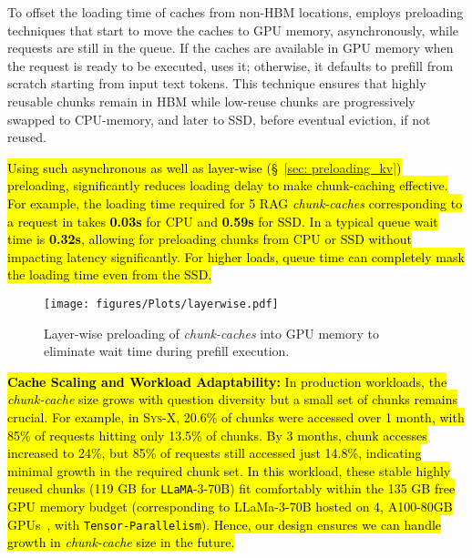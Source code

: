 To offset the loading time of caches from non-HBM locations, \sys employs preloading techniques that start to move the caches to GPU memory, asynchronously, while requests are still in the queue.
If the caches are available in GPU memory when the request is ready to be executed, \sys uses it; otherwise, it defaults to prefill from scratch starting from input text tokens. 
This technique ensures that highly reusable chunks remain in HBM while low-reuse chunks are progressively swapped to CPU-memory, and later to SSD, before eventual eviction, if not reused. 

\hl{Using such asynchronous as well as layer-wise (\S~\ref{sec: preloading_kv}) preloading, \sys significantly reduces loading delay to make chunk-caching effective.
%
For example, the loading time required for 5 RAG \textit{chunk-caches} corresponding to a request in \X takes \textbf{0.03s} for CPU and \textbf{0.59s} for SSD. 
In \X a typical queue wait time is \textbf{0.32s}, allowing for preloading chunks from CPU or SSD without impacting latency significantly.
For higher loads, queue time can completely mask the loading time even from the SSD.
}






\begin{figure}[t]
    \centering
    \texttt{[image: figures/Plots/layerwise.pdf]}
    \caption{Layer-wise preloading of \textit{chunk-caches} into GPU memory to eliminate wait time during prefill execution.}
    \label{fig: layerwise}
\end{figure}



\hl{\textbf{Cache Scaling and Workload Adaptability:} In production workloads, the \textit{chunk-cache} size grows with question diversity but a small set of chunks remains crucial. For example, in \textsc{Sys-X}, 20.6\% of chunks were accessed over 1 month, with 85\% of requests hitting only 13.5\% of chunks. By 3 months, chunk accesses increased to 24\%, but 85\% of requests still accessed just 14.8\%, indicating minimal growth in the required chunk set. In this workload, these stable highly reused chunks (119 GB for \texttt{LLaMA}-3-70B) fit comfortably within the 135 GB free GPU memory budget (corresponding to LLaMa-3-70B hosted on 4, A100-80GB GPUs~\cite{9361255}, with \texttt{Tensor-Parallelism}). 
Hence, our design ensures we can handle growth in \textit{chunk-cache} size in the future. 
}

